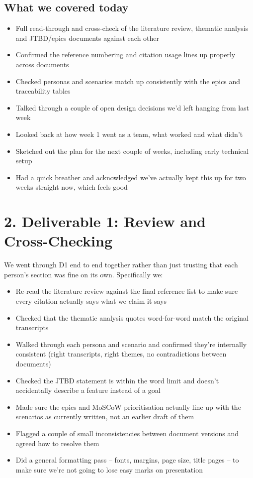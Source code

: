 \documentclass[11pt,a4paper]{article}
\begin{document}
\subsection*{What we covered today}
\begin{itemize}
    \item Full read-through and cross-check of the literature review, thematic analysis and JTBD/epics documents against each other
    \item Confirmed the reference numbering and citation usage lines up properly across documents
    \item Checked personas and scenarios match up consistently with the epics and traceability tables
    \item Talked through a couple of open design decisions we'd left hanging from last week
    \item Looked back at how week 1 went as a team, what worked and what didn't
    \item Sketched out the plan for the next couple of weeks, including early technical setup
    \item Had a quick breather and acknowledged we've actually kept this up for two weeks straight now, which feels good
\end{itemize}

\vspace{10pt}
\section*{2. Deliverable 1: Review and Cross-Checking}

We went through D1 end to end together rather than just trusting that each person's section was fine on its own. Specifically we:

\begin{itemize}
    \item Re-read the literature review against the final reference list to make sure every citation actually says what we claim it says
    \item Checked that the thematic analysis quotes word-for-word match the original transcripts
    \item Walked through each persona and scenario and confirmed they're internally consistent (right transcripts, right themes, no contradictions between documents)
    \item Checked the JTBD statement is within the word limit and doesn't accidentally describe a feature instead of a goal
    \item Made sure the epics and MoSCoW prioritisation actually line up with the scenarios as currently written, not an earlier draft of them
    \item Flagged a couple of small inconsistencies between document versions and agreed how to resolve them
    \item Did a general formatting pass -- fonts, margins, page size, title pages -- to make sure we're not going to lose easy marks on presentation
\end{itemize}
\end{document}
